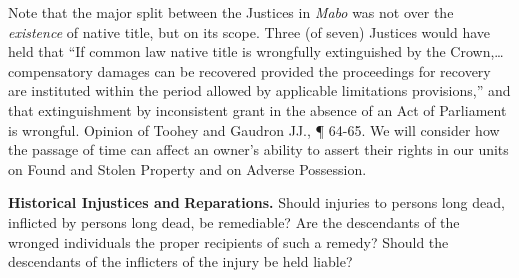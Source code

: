 Note that the major split between the Justices in \textit{Mabo} was not over the
\textit{existence} of native title, but on its scope. Three (of seven) Justices
would have held that ``If common law native title is wrongfully extinguished by
the Crown,\ldots compensatory damages can be recovered provided the proceedings
for recovery are instituted within the period allowed by applicable limitations
provisions,'' and that extinguishment by inconsistent grant in the absence of an
Act of Parliament is wrongful. Opinion of Toohey and Gaudron JJ., {\P} 64-65. We
will consider how the passage of time can affect an owner's ability to assert
their rights in our units on Found and Stolen Property and on Adverse
Possession.


\item \textbf{Historical Injustices and} \textbf{Reparations.} Should injuries
to persons long dead, inflicted by persons long dead, be remediable? Are the
descendants of the wronged individuals the proper recipients of such a remedy?
Should the descendants of the inflicters of the injury be held liable?

